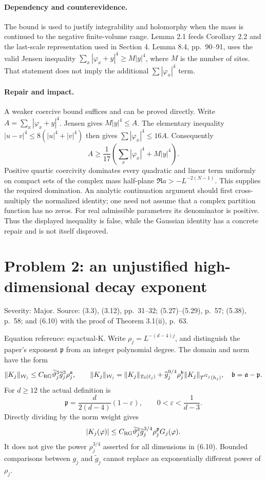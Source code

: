\documentclass[10pt]{article}
\begin{document}
\paragraph*{Dependency and counterevidence.}\mbox{}\par
The bound is used to justify integrability and holomorphy when the mass is continued to the negative finite-volume range. Lemma 2.1 feeds Corollary 2.2 and the last-scale representation used in Section 4. Lemma 8.4, pp. 90–91, uses the valid Jensen inequality \(\sum_x|\varphi_x+y|^4\geq M|y|^4\), where \(M\) is the number of sites. That statement does not imply the additional \(\sum|\varphi_x|^4\) term.\par
\paragraph*{Repair and impact.}\mbox{}\par
A weaker coercive bound suffices and can be proved directly. Write \(A=\sum_x|\varphi_x+y|^4\). Jensen gives \(M|y|^4\leq A\). The elementary inequality \(|u-v|^4\leq8(|u|^4+|v|^4)\) then gives \(\sum|\varphi_x|^4\leq16A\). Consequently \[A\geq \frac1{17}\left(\sum_x|\varphi_x|^4+M|y|^4\right).\] Positive quartic coercivity dominates every quadratic and linear term uniformly on compact sets of the complex mass half-plane \(\Re a>-L^{-2(N-1)}\). This supplies the required domination. An analytic continuation argument should first cross-multiply the normalized identity; one need not assume that a complex partition function has no zeros. For real admissible parameters its denominator is positive. Thus the displayed inequality is false, while the Gaussian identity has a concrete repair and is not itself disproved.\par
\section*{Problem 2: an unjustified high-dimensional decay exponent}
Severity: Major. Source: (3.3), (3.12), pp. 31–32; (5.27)–(5.29), p. 57; (5.38), p. 58; and (6.10) with the proof of Theorem 3.1(ii), p. 63.\par
Equation reference: eq:actual-K. Write \(\rho_j=L^{-(d-4)j}\), and distinguish the paper’s exponent \(\mathfrak p\) from an integer polynomial degree. The domain and norm have the form \[\|K_j\|_{\mathcal W_j}\leq C_{\rm RG}\widetilde\vartheta_j^3
             \widetilde g_j^3\rho_j^{\mathfrak a},\qquad
 \|K_j\|_{\mathcal W_j}
 =\|K_j\|_{T_0(\ell_j)}
       +\widetilde g_j^{9/4}\rho_j^{\mathfrak b}
                       \|K_j\|_{T^{G_j}(h_j)},
 \quad \mathfrak b=\mathfrak a-\mathfrak p .\] For \(d\geq12\) the actual definition is \[\mathfrak p=\frac{d}{2(d-4)}(1-\varepsilon),\qquad
 0<\varepsilon<\frac1{d-3}.\] Directly dividing by the norm weight gives \[
 |K_j(\varphi)|\leq C_{\rm RG}\widetilde\vartheta_j^3
       \widetilde g_j^{3/4}\rho_j^{\mathfrak p}G_j(\varphi).\] It does not give the power \(\rho_j^{3/4}\) asserted for all dimensions in (6.10). Bounded comparisons between \(g_j\) and \(\widetilde g_j\) cannot replace an exponentially different power of \(\rho_j\).\par
\end{document}
